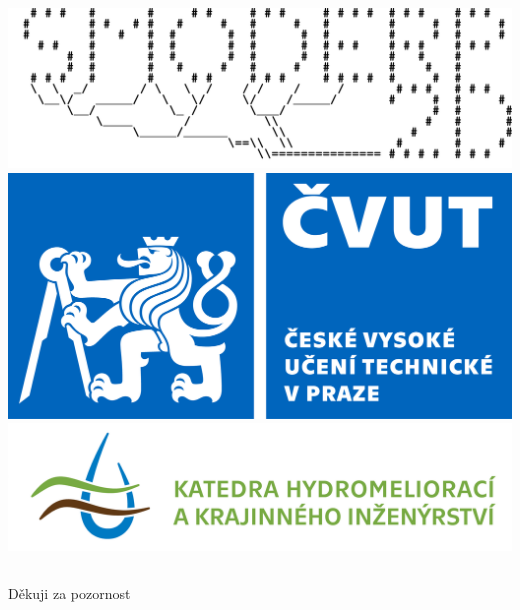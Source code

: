 \begin{frame}[plain]
\begin{columns}
\begin{column}{0.5\textwidth}
            \hfill\includegraphics[height=0.15\textheight]{loga/logsmoderp.png}\\\vspace{0.5em}
            \hfill\includegraphics[height=0.15\textheight]{loga/logo_CVUT.jpg}\\\vspace{0.5em}
            \hfill\includegraphics[height=0.15\textheight]{loga/K143napisL_bar_3674x935.png}\\\vspace{0.5em}
        \end{column}
    \end{columns}
    \begin{center}{\Huge Děkuji za pozornost}\end{center}
\end{frame}

